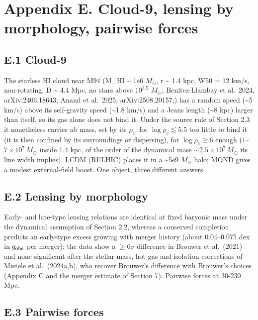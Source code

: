 \documentclass[
  10pt,
]{article}
\begin{document}
\section{Appendix E. Cloud-9, lensing by morphology, pairwise forces}\label{appendix-e.-cloud-9-lensing-by-morphology-pairwise-forces}

\subsection{E.1 Cloud-9}

The starless HI cloud near M94 (M\_HI \textasciitilde{} 1e6
$M_\odot$, r \textasciitilde{} 1.4 kpc, W50 = 12 km/s, non-rotating, D
\textasciitilde{} 4.4 Mpc, no stars above $10^{3.5}$ $M_\odot$;
Benitez-Llambay et al.~2024, arXiv:2406.18643; Anand et al.~2025,
arXiv:2508.20157;) has a random
speed (\textasciitilde{}5 km/s) above its self-gravity speed
(\textasciitilde{}1.8 km/s) and a Jeans length (\textasciitilde{}8 kpc)
larger than itself, so its gas alone does not bind it. Under the source rule of
Section 2.3 it nonetheless carries nb mass, set by its $\rho_c$: for
$\log\rho_c\lesssim5.5$ too little to bind it (it is then confined by its
surroundings or dispersing), for $\log\rho_c\gtrsim6$ enough
($1$--$7\times10^7\,M_\odot$ inside 1.4 kpc, of the order of the dynamical mass
$\sim2.5\times10^7\,M_\odot$ its line width implies). LCDM (RELHIC) places it in a
\textasciitilde{}5e9 $M_\odot$ halo; MOND gives a modest external-field boost.
One object, three different answers.

\subsection{E.2 Lensing by morphology}

Early- and late-type lensing relations are identical at fixed baryonic mass under the dynamical assumption of Section 2.2, whereas a conserved completion predicts an early-type excess growing with merger history (about 0.04--0.075 dex in $g_{\rm obs}$ per merger); the data show a $\ge6\sigma$ difference in Brouwer et al.~(2021) and none significant after the stellar-mass, hot-gas and isolation corrections of Mistele et al.~(2024a,b), who recover Brouwer's difference with Brouwer's choices (Appendix C and the merger estimate of Section 7). Pairwise forces at 30-230 Mpc.

\subsection{E.3 Pairwise forces}
\end{document}
